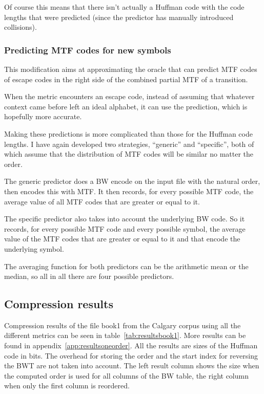 \documentclass[a4paper]{scrreprt}
\begin{document}
Of course this means that there isn't actually a Huffman code with the code
lengths that were predicted (since the predictor has manually introduced
collisions).

\subsubsection{Predicting MTF codes for new symbols}

This modification aims at approximating the oracle that can predict MTF codes of
escape codes in the right side of the combined partial MTF of a transition.

When the metric encounters an escape code, instead of assuming that whatever
context came before left an ideal alphabet, it can use the prediction, which is
hopefully more accurate.

Making these predictions is more complicated than those for the Huffman code
lengths. I have again developed two strategies, ``generic'' and ``specific'',
both of which assume that the distribution of MTF codes will be similar no
matter the order.

The generic predictor does a BW encode on the input file with the natural order,
then encodes this with MTF. It then records, for every possible MTF code, the
average value of all MTF codes that are greater or equal to it.

The specific predictor also takes into account the underlying BW code. So it
records, for every possible MTF code and every possible symbol, the average
value of the MTF codes that are greater or equal to it and that encode the
underlying symbol.

The averaging function for both predictors can be the arithmetic mean or the
median, so all in all there are four possible predictors.

\subsection{Compression results}

Compression results of the file book1 from the Calgary corpus using all the
different metrics can be seen in table~\ref{tab:resultsbook1}. More results can
be found in appendix~\ref{app:resultsoneorder}.
All the results are sizes of the Huffman code in bits. The overhead for storing
the order and the start index for reversing the BWT are not taken into account.
The left result column shows the size when the computed order is used for all
columns of the BW table, the right column when only the first column is
reordered.
\end{document}
